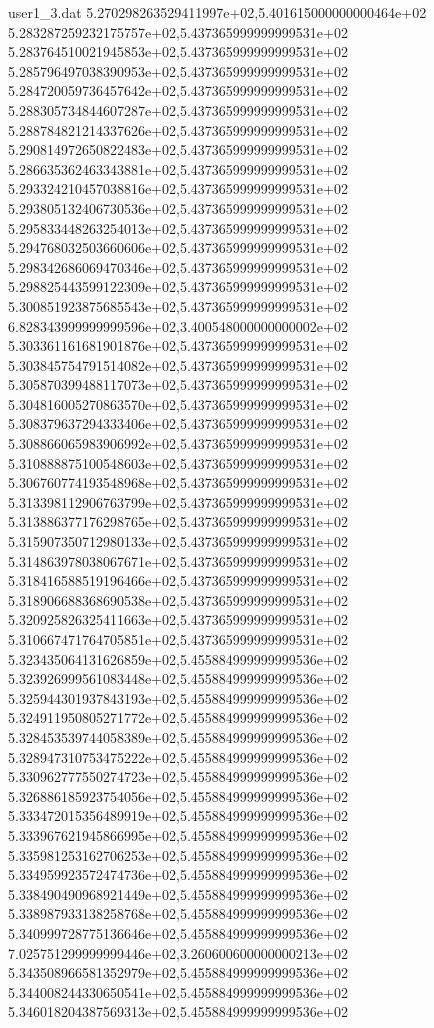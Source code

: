 \begin{filecontents}{user1_3.dat}
5.270298263529411997e+02,5.401615000000000464e+02
5.283287259232175757e+02,5.437365999999999531e+02
5.283764510021945853e+02,5.437365999999999531e+02
5.285796497038390953e+02,5.437365999999999531e+02
5.284720059736457642e+02,5.437365999999999531e+02
5.288305734844607287e+02,5.437365999999999531e+02
5.288784821214337626e+02,5.437365999999999531e+02
5.290814972650822483e+02,5.437365999999999531e+02
5.286635362463343881e+02,5.437365999999999531e+02
5.293324210457038816e+02,5.437365999999999531e+02
5.293805132406730536e+02,5.437365999999999531e+02
5.295833448263254013e+02,5.437365999999999531e+02
5.294768032503660606e+02,5.437365999999999531e+02
5.298342686069470346e+02,5.437365999999999531e+02
5.298825443599122309e+02,5.437365999999999531e+02
5.300851923875685543e+02,5.437365999999999531e+02
6.828343999999999596e+02,3.400548000000000002e+02
5.303361161681901876e+02,5.437365999999999531e+02
5.303845754791514082e+02,5.437365999999999531e+02
5.305870399488117073e+02,5.437365999999999531e+02
5.304816005270863570e+02,5.437365999999999531e+02
5.308379637294333406e+02,5.437365999999999531e+02
5.308866065983906992e+02,5.437365999999999531e+02
5.310888875100548603e+02,5.437365999999999531e+02
5.306760774193548968e+02,5.437365999999999531e+02
5.313398112906763799e+02,5.437365999999999531e+02
5.313886377176298765e+02,5.437365999999999531e+02
5.315907350712980133e+02,5.437365999999999531e+02
5.314863978038067671e+02,5.437365999999999531e+02
5.318416588519196466e+02,5.437365999999999531e+02
5.318906688368690538e+02,5.437365999999999531e+02
5.320925826325411663e+02,5.437365999999999531e+02
5.310667471764705851e+02,5.437365999999999531e+02
5.323435064131626859e+02,5.455884999999999536e+02
5.323926999561083448e+02,5.455884999999999536e+02
5.325944301937843193e+02,5.455884999999999536e+02
5.324911950805271772e+02,5.455884999999999536e+02
5.328453539744058389e+02,5.455884999999999536e+02
5.328947310753475222e+02,5.455884999999999536e+02
5.330962777550274723e+02,5.455884999999999536e+02
5.326886185923754056e+02,5.455884999999999536e+02
5.333472015356489919e+02,5.455884999999999536e+02
5.333967621945866995e+02,5.455884999999999536e+02
5.335981253162706253e+02,5.455884999999999536e+02
5.334959923572474736e+02,5.455884999999999536e+02
5.338490490968921449e+02,5.455884999999999536e+02
5.338987933138258768e+02,5.455884999999999536e+02
5.340999728775136646e+02,5.455884999999999536e+02
7.025751299999999446e+02,3.260600600000000213e+02
5.343508966581352979e+02,5.455884999999999536e+02
5.344008244330650541e+02,5.455884999999999536e+02
5.346018204387569313e+02,5.455884999999999536e+02

\end{filecontents}
